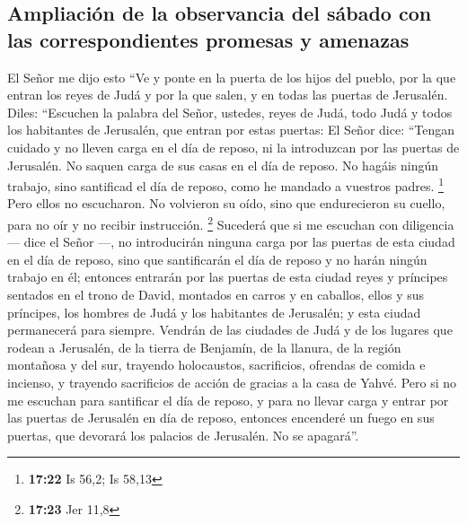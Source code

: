 \begin{paracol}{2}
\hypertarget{ampliaciuxf3n-de-la-observancia-del-suxe1bado-con-las-correspondientes-promesas-y-amenazas}{%
\subsection{Ampliación de la observancia del sábado con las
correspondientes promesas y
amenazas}\label{ampliaciuxf3n-de-la-observancia-del-suxe1bado-con-las-correspondientes-promesas-y-amenazas}}

 El Señor me dijo esto ``Ve y ponte en la puerta de los
hijos del pueblo, por la que entran los reyes de Judá y por la que
salen, y en todas las puertas de Jerusalén.  Diles:
``Escuchen la palabra del Señor, ustedes, reyes de Judá, todo Judá y
todos los habitantes de Jerusalén, que entran por estas puertas:
 El Señor dice: ``Tengan cuidado y no lleven carga en el
día de reposo, ni la introduzcan por las puertas de Jerusalén.
 No saquen carga de sus casas en el día de reposo. No
hagáis ningún trabajo, sino santificad el día de reposo, como he mandado
a vuestros padres. \footnote{\textbf{17:22} Is 56,2; Is 58,13}
 Pero ellos no escucharon. No volvieron su oído, sino que
endurecieron su cuello, para no oír y no recibir instrucción.
\footnote{\textbf{17:23} Jer 11,8}  Sucederá que si me
escuchan con diligencia --- dice el Señor ---, no introducirán ninguna
carga por las puertas de esta ciudad en el día de reposo, sino que
santificarán el día de reposo y no harán ningún trabajo en él;
 entonces entrarán por las puertas de esta ciudad reyes y
príncipes sentados en el trono de David, montados en carros y en
caballos, ellos y sus príncipes, los hombres de Judá y los habitantes de
Jerusalén; y esta ciudad permanecerá para siempre. 
Vendrán de las ciudades de Judá y de los lugares que rodean a Jerusalén,
de la tierra de Benjamín, de la llanura, de la región montañosa y del
sur, trayendo holocaustos, sacrificios, ofrendas de comida e incienso, y
trayendo sacrificios de acción de gracias a la casa de Yahvé.
 Pero si no me escuchan para santificar el día de reposo,
y para no llevar carga y entrar por las puertas de Jerusalén en día de
reposo, entonces encenderé un fuego en sus puertas, que devorará los
palacios de Jerusalén. No se apagará''.

\switchcolumn
\begin{otherlanguage}{english}

\hypertarget{judahs-unforgivable-guilt-and-gods-severe-punishment}{%
}
\end{otherlanguage}
\end{paracol}
